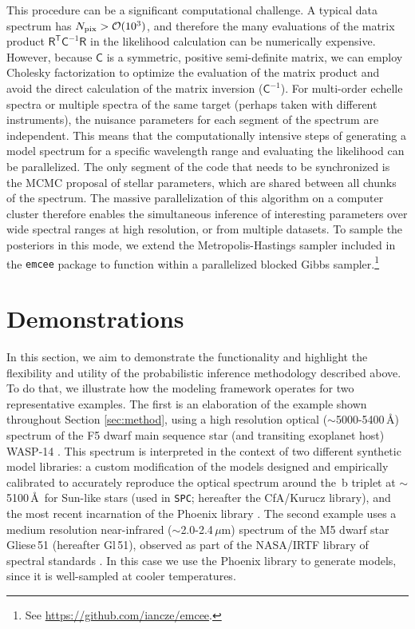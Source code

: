 \documentclass[iop,floatfix,numberedappendix,twocolappendix]{emulateapj}
\newcommand{\vR}{\mathsf{R}}
\newcommand{\vC}{\mathsf{C}}
\newcommand{\trans}{\mathsf{T}}
\begin{document}
This procedure can be a significant computational challenge.  A typical data spectrum has $N_{\rm 
pix} > \mathcal{O}(10^3)$, and therefore the many evaluations of the matrix product $\vR^{\trans} 
\vC^{-1} \vR$ in the likelihood calculation can be numerically expensive.  However, because $\vC$ 
is a symmetric, positive semi-definite matrix, we can employ Cholesky factorization to optimize the 
evaluation of the matrix product and avoid the direct calculation of the matrix inversion 
($\vC^{-1}$).  For multi-order echelle spectra or multiple spectra of the same target (perhaps 
taken with different instruments), the nuisance parameters for each segment of the spectrum are 
independent. This means that the computationally intensive steps of generating a model spectrum
for a specific wavelength range and evaluating the likelihood can be parallelized. The only segment 
of the code that needs to be synchronized is the MCMC proposal of stellar parameters, which are 
shared between all chunks of the spectrum.  The massive parallelization of this algorithm on a 
computer cluster therefore enables the simultaneous inference of interesting parameters over wide 
spectral ranges at high resolution, or from multiple datasets.  To sample the posteriors in this 
mode, we extend the Metropolis-Hastings sampler included in the {\tt emcee} package 
\citep{foreman-mackey13} to function within a parallelized blocked Gibbs 
sampler.\footnote{See \url{https://github.com/iancze/emcee}.}\\


\section{Demonstrations} \label{sec:examples}

In this section, we aim to demonstrate the functionality and highlight the flexibility and utility 
of the probabilistic inference methodology described above.  To do that, we illustrate how the 
modeling framework operates for two representative examples.  The first is an elaboration of the 
example shown throughout Section \ref{sec:method}, using a high resolution optical 
($\sim$5000-5400\,\AA) spectrum of the F5 dwarf main sequence star (and transiting exoplanet host) 
WASP-14 \citep{joshi09,torres12}.  This spectrum is interpreted in the context of two different 
synthetic model libraries: a custom modification of the \citet{castelli04} models designed and 
empirically calibrated to accurately reproduce the optical spectrum around the \,b triplet at 
$\sim$5100\,\AA\ for Sun-like stars (used in {\tt SPC}; hereafter the {\sc CfA/Kurucz} library), 
and the most recent incarnation of the {\sc Phoenix} library \citep{husser13}.  The second 
example uses a medium resolution near-infrared ($\sim$2.0-2.4\,$\mu$m) spectrum of the M5 dwarf 
star Gliese\,51 (hereafter Gl\,51), observed as part of the NASA/IRTF library of spectral standards 
\citep{cushing05,rayner09}.  In this case we use the {\sc Phoenix} library to generate models, 
since it is well-sampled at cooler temperatures.
\end{document}
